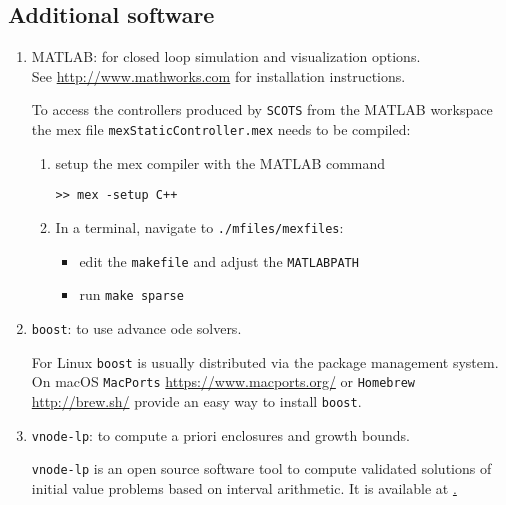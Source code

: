 \documentclass[a4paper]{amsart}
\begin{document}
\subsection{Additional software} 
\label{s:installation:cudd}
\begin{enumerate}


  \item MATLAB: for closed loop simulation and visualization options.\\
	See \url{http://www.mathworks.com} for installation instructions.

	To access the controllers produced by {\tt SCOTS} from the MATLAB workspace
  the mex file {\tt mexStaticController.mex}  needs to be compiled:
	\begin{enumerate}
 	\item setup the mex compiler with the MATLAB command
	\begin{lstlisting}[basicstyle=\small\ttfamily,frame=none]
	>> mex -setup C++
	\end{lstlisting}
	\item In a terminal, navigate to {\tt\small ./mfiles/mexfiles}:
	\begin{itemize}
    \item edit the {\tt makefile} and adjust the {\tt MATLABPATH} 
		\item run  {\tt make sparse}
  \end{itemize}
  \end{enumerate}

  \item {\tt boost}: to use advance ode solvers. 

  For Linux {\tt boost} is usually
  distributed via the package management system. On macOS {\tt MacPorts}
  \url{https://www.macports.org/} or {\tt Homebrew} \url{http://brew.sh/} provide an easy way to install
  {\tt boost}.

  \item {\tt vnode-lp}: to compute a priori enclosures and growth bounds.

  {\tt vnode-lp} is an open source software tool to compute validated solutions
  of initial value problems based on  interval arithmetic. It is available at
  \href{http://www.cas.mcmaster.ca/~nedialk/vnodelp}.




\end{enumerate}
\end{document}
